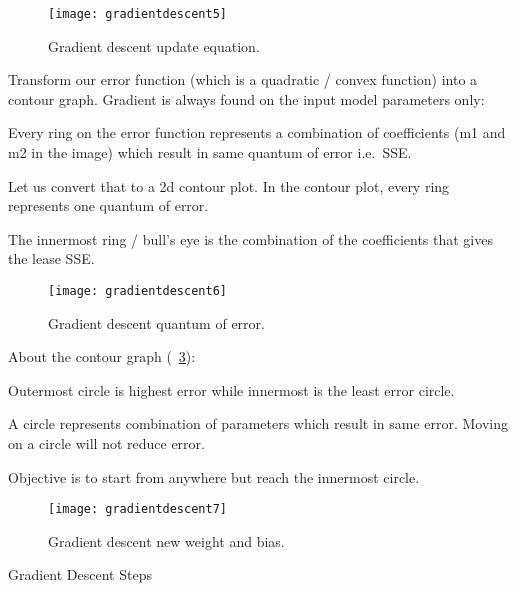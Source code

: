 	\begin{figure}[htb]
		\centering
		\texttt{[image: gradientdescent5]}
		\caption[Gradient descent update equation]{Gradient descent update equation.}
		\label{fig:gradientdescent5}
	\end{figure}


Transform our error function (which is a quadratic / convex function) into a contour graph. Gradient is
always found on the input model parameters only:

	\begin{bulletedlist}
		\item Every ring on the error function represents a combination of coefficients (m1 and m2 in the image) which result in same quantum of error i.e.\ SSE.
		\item Let us convert that to a 2d contour plot. In the contour plot, every ring represents one quantum of error.
		\item The innermost ring / bull's eye is the combination of the coefficients that gives the lease SSE.
	\end{bulletedlist}

	\begin{figure}[htb]
		\centering
		\texttt{[image: gradientdescent6]}
		\caption[Gradient descent quantum of error]{Gradient descent quantum of error.}
		\label{fig:gradientdescent6}
	\end{figure}

About the contour graph (\figurename~\ref{fig:gradientdescent7}):
	\begin{bulletedlist}
		\item Outermost circle is highest error while innermost is the least error circle.
		\item A circle represents combination of parameters which result in same error. Moving on a circle will not reduce error.
		\item Objective is to start from anywhere but reach the innermost circle.
	\end{bulletedlist}

	\begin{figure}[htb]
		\centering
		\texttt{[image: gradientdescent7]}
		\caption[Gradient descent new weight and bias]{Gradient descent new weight and bias.}
		\label{fig:gradientdescent7}
	\end{figure}


Gradient Descent Steps

